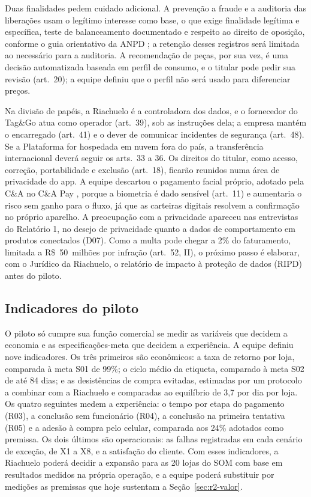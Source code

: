 Duas finalidades pedem cuidado adicional. A prevenção a fraude e a auditoria das liberações usam o legítimo interesse como base, o que exige finalidade legítima e específica, teste de balanceamento documentado e respeito ao direito de oposição, conforme o guia orientativo da ANPD \cite{anpd2024legitimo}; a retenção desses registros será limitada ao necessário para a auditoria. A recomendação de peças, por sua vez, é uma decisão automatizada baseada em perfil de consumo, e o titular pode pedir sua revisão (art.~20); a equipe definiu que o perfil não será usado para diferenciar preços.

Na divisão de papéis, a Riachuelo é a controladora dos dados, e o fornecedor do Tag\&Go atua como operador (art.~39), sob as instruções dela; a empresa mantém o encarregado (art.~41) e o dever de comunicar incidentes de segurança (art.~48). Se a Plataforma for hospedada em nuvem fora do país, a transferência internacional deverá seguir os arts.~33 a 36. Os direitos do titular, como acesso, correção, portabilidade e exclusão (art.~18), ficarão reunidos numa área de privacidade do app. A equipe descartou o pagamento facial próprio, adotado pela C\&A no C\&A Pay \cite{mobiletime2023cea}, porque a biometria é dado sensível (art.~11) e aumentaria o risco sem ganho para o fluxo, já que as carteiras digitais resolvem a confirmação no próprio aparelho. A preocupação com a privacidade apareceu nas entrevistas do Relatório 1, no desejo de privacidade quanto a dados de comportamento em produtos conectados (D07). Como a multa pode chegar a 2\% do faturamento, limitada a R\$~50~milhões por infração (art.~52, II), o próximo passo é elaborar, com o Jurídico da Riachuelo, o relatório de impacto à proteção de dados (RIPD) antes do piloto.

\subsection{Indicadores do piloto}
\label{sub:r2-indicadores}

O piloto só cumpre sua função comercial se medir as variáveis que decidem a economia e as especificações-meta que decidem a experiência. A equipe definiu nove indicadores. Os três primeiros são econômicos: a taxa de retorno por loja, comparada à meta S01 de 99\%; o ciclo médio da etiqueta, comparado à meta S02 de até 84 dias; e as desistências de compra evitadas, estimadas por um protocolo a combinar com a Riachuelo e comparadas ao equilíbrio de 3,7 por dia por loja. Os quatro seguintes medem a experiência: o tempo por etapa do pagamento (R03), a conclusão sem funcionário (R04), a conclusão na primeira tentativa (R05) e a adesão à compra pelo celular, comparada aos 24\% adotados como premissa. Os dois últimos são operacionais: as falhas registradas em cada cenário de exceção, de X1 a X8, e a satisfação do cliente. Com esses indicadores, a Riachuelo poderá decidir a expansão para as 20 lojas do SOM com base em resultados medidos na própria operação, e a equipe poderá substituir por medições as premissas que hoje sustentam a Seção~\ref{sec:r2-valor}.
